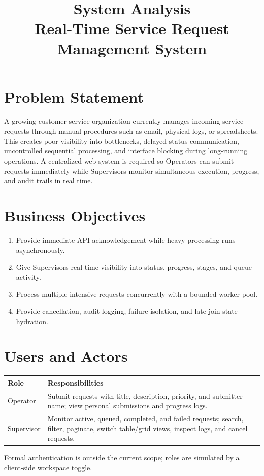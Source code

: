 \documentclass[11pt,a4paper]{article}
\title{System Analysis\\Real-Time Service Request Management System}
\author{}
\date{}
\begin{document}
\maketitle

\section{Problem Statement}
A growing customer service organization currently manages incoming service requests through manual procedures such as email, physical logs, or spreadsheets. This creates poor visibility into bottlenecks, delayed status communication, uncontrolled sequential processing, and interface blocking during long-running operations. A centralized web system is required so Operators can submit requests immediately while Supervisors monitor simultaneous execution, progress, and audit trails in real time.

\section{Business Objectives}
\begin{enumerate}
\item Provide immediate API acknowledgement while heavy processing runs asynchronously.
\item Give Supervisors real-time visibility into status, progress, stages, and queue activity.
\item Process multiple intensive requests concurrently with a bounded worker pool.
\item Provide cancellation, audit logging, failure isolation, and late-join state hydration.
\end{enumerate}

\section{Users and Actors}
\begin{longtable}{p{}p{}}
\toprule
\textbf{Role} & \textbf{Responsibilities}\\\midrule
Operator & Submit requests with title, description, priority, and submitter name; view personal submissions and progress logs.\\
Supervisor & Monitor active, queued, completed, and failed requests; search, filter, paginate, switch table/grid views, inspect logs, and cancel requests.\\
\bottomrule
\end{longtable}
Formal authentication is outside the current scope; roles are simulated by a client-side workspace toggle.
\end{document}
